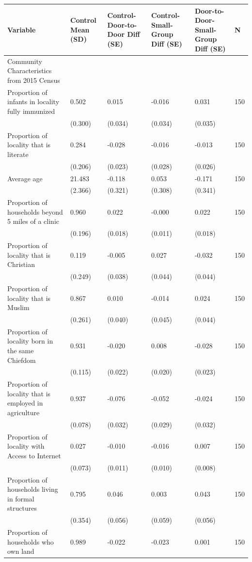 
\begin{tabular}{llllll}
\toprule
Variable & Control Mean (SD) & Control-Door-to-Door Diff (SE) & Control-Small-Group Diff (SE) & Door-to-Door-Small-Group Diff (SE) & N\\
\midrule
Community Characteristics from 2015 Census &  &  &  &  & \\
Proportion of infants in locality fully immunized & 0.502 & 0.015 & -0.016 & 0.031 & 150\\
 & (0.300) & (0.034) & (0.034) & (0.035) & \\
Proportion of locality that is literate & 0.284 & -0.028 & -0.016 & -0.013 & 150\\
 & (0.206) & (0.023) & (0.028) & (0.026) & \\
\addlinespace
Average age & 21.483 & -0.118 & 0.053 & -0.171 & 150\\
 & (2.366) & (0.321) & (0.308) & (0.341) & \\
Proportion of households beyond 5 miles of a clinic & 0.960 & 0.022 & -0.000 & 0.022 & 150\\
 & (0.196) & (0.018) & (0.011) & (0.018) & \\
Proportion of locality that is Christian & 0.119 & -0.005 & 0.027 & -0.032 & 150\\
\addlinespace
 & (0.249) & (0.038) & (0.044) & (0.044) & \\
Proportion of locality that is Muslim & 0.867 & 0.010 & -0.014 & 0.024 & 150\\
 & (0.261) & (0.040) & (0.045) & (0.044) & \\
Proportion of locality born in the same Chiefdom & 0.931 & -0.020 & 0.008 & -0.028 & 150\\
 & (0.115) & (0.022) & (0.020) & (0.023) & \\
\addlinespace
Proportion of locality that is employed in agriculture & 0.937 & -0.076 & -0.052 & -0.024 & 150\\
 & (0.078) & (0.032) & (0.029) & (0.032) & \\
Proportion of locality with Access to Internet & 0.027 & -0.010 & -0.016 & 0.007 & 150\\
 & (0.073) & (0.011) & (0.010) & (0.008) & \\
Proportion of households living in formal structures & 0.795 & 0.046 & 0.003 & 0.043 & 150\\
\addlinespace
 & (0.354) & (0.056) & (0.059) & (0.056) & \\
Proportion of households who own land & 0.989 & -0.022 & -0.023 & 0.001 & 150\\

\end{tabular}
